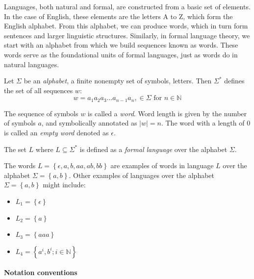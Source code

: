 Languages, both natural and formal, are constructed from a basic set of elements. In the case of English, these elements are the letters A to Z, which form the English alphabet. From this alphabet, we can produce words, which in turn form sentences and larger linguistic structures. Similarly, in formal language theory, we start with an alphabet from which we build sequences known as words. These words serve as the foundational units of formal languages, just as words do in natural languages.

\begin{definition}[Alphabet]\label{def:alphabet}
Let $\Sigma$ be an \emph{alphabet}, a finite nonempty set of symbols, letters. Then $\Sigma ^{*}$ defines the set of all sequences $w$:
$$w= a_1 a_2 a_3 \dots a_{n-1} a_n, \in \Sigma \text{ for } n \in \mathbb{N}$$
\end{definition}

The sequence of symbols $w$ is called a \emph{word}. Word length is given by the number of symbols $a$, and symbolically annotated as $|w| = n$. The word with a length of 0 is called an \emph{empty word} denoted as $\epsilon$.

\begin{definition}[Language]\label{def:language}
The set $L$ where $L\subseteq \Sigma^{*}$ is defined as a \emph{formal language} over the alphabet $\Sigma$. 
\end{definition}
The words $L = \left\lbrace \epsilon, a, b, aa, ab, bb \right\rbrace$ are examples of words in language $L$ over the alphabet $\Sigma=\left\lbrace a,b \right\rbrace$.
Other examples of languages over the alphabet $\Sigma=\left\lbrace a,b \right\rbrace$ might include:
\begin{itemize}
\item $L_1 = \left\lbrace \epsilon \right\rbrace$
\item $L_2 = \left\lbrace a \right\rbrace$
\item $L_3 = \left\lbrace aaa \right\rbrace$
\item $L_4 = \left\lbrace a^i,b^i; i \in \mathbb{N} \right\rbrace$
\end{itemize}




\paragraph*{Notation conventions}



